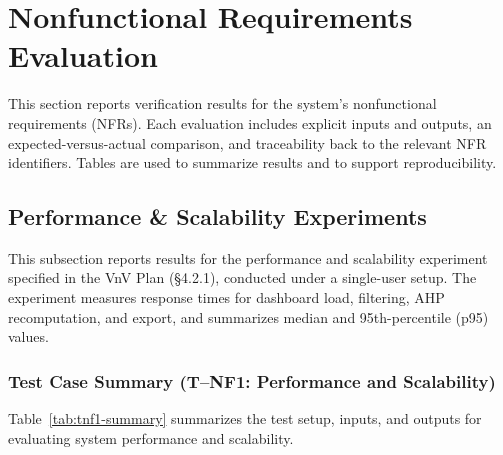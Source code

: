 \documentclass[12pt, titlepage]{article}
\begin{document}
\section{Nonfunctional Requirements Evaluation}

\label{sec:nfr}

This section reports verification results for the system's nonfunctional
requirements (NFRs).  Each evaluation
includes explicit inputs and outputs, an expected-versus-actual comparison,
and traceability back to the relevant NFR identifiers.  Tables are used to
summarize results and to support reproducibility.

\subsection{Performance \& Scalability Experiments}
\label{sec:nfr-perfscalability}

This subsection reports results for the performance and
scalability experiment specified in the VnV Plan (\S4.2.1),
conducted under a single-user setup. The experiment
measures response times for dashboard load, filtering, AHP recomputation, and
export, and summarizes median and 95th-percentile (p95) values.

\subsubsection{Test Case Summary (T--NF1: Performance and Scalability)}
Table~\ref{tab:tnf1-summary} summarizes the test setup, inputs, and outputs for evaluating system performance and scalability.
\end{document}
